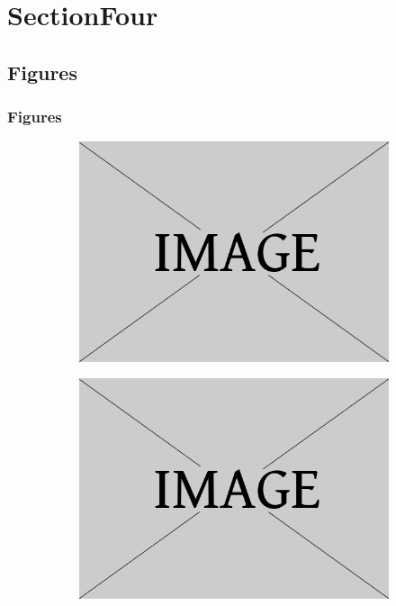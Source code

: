 \documentclass[aspectratio=169, serif ]{beamer}
\begin{document}
\section{SectionFour}
\subsection{Figures}
\begin{frame}
    \frametitle{Figures}
    \begin{figure}
     \centering
     \begin{subfigure}[b]{0.3\textwidth}
         \centering
         \includegraphics[width=\textwidth]{Figures/example.jpg}
         \caption{}
         \label{fig:a}
     \end{subfigure}
     \hfill
     \begin{subfigure}[b]{0.3\textwidth}
         \centering
         \includegraphics[width=\textwidth]{Figures/example.jpg}

\end{subfigure}
\end{figure}
\end{frame}
\end{document}
